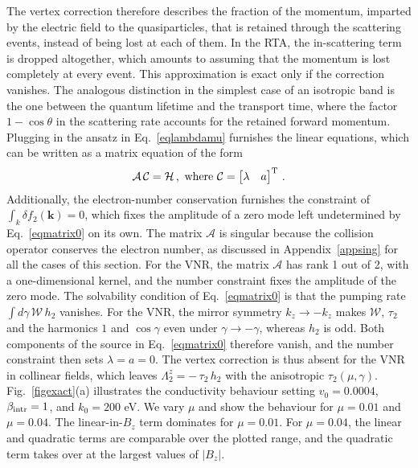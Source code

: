 \documentclass[aps,prb,onecolumn,nofootinbib,citeautoscript,10pt]{revtex4-2}
\begin{document}
The vertex correction therefore describes the fraction of the momentum, imparted by the electric field to the quasiparticles, that is retained through the scattering events, instead of being lost at each of them. In the RTA, the in-scattering term is dropped altogether, which amounts to assuming that the momentum is lost completely at every event. This approximation is exact only if the correction vanishes. The analogous distinction in the simplest case of an isotropic band is the one between the quantum lifetime and the transport time, where the factor $1-\cos\theta$ in the scattering rate accounts for the retained forward momentum. Plugging in the ansatz in Eq.~\eqref{eqlambdamu} furnishes
the linear equations, which can be written as a matrix equation of the form
\begin{align}
\label{eqmatrix0}
\mathcal A \, \mathcal C = \mathcal H \,, \text{ where }
\mathcal C =\begin{bmatrix}
\lambda & a 
\end{bmatrix}^{\rm T}\,.
\end{align}
Additionally, the electron-number conservation furnishes the constraint of
$\int_k  \delta f_{2} (\boldsymbol {k}) = 0 $, which fixes the amplitude of a zero mode left undetermined by Eq.~\eqref{eqmatrix0} on its own. 
The matrix $\mathcal A$ is singular because the collision operator conserves the electron number, as discussed in Appendix~\ref{appsing} for all the cases of this section. For the VNR, the matrix $\mathcal A$ has rank 1 out of 2, with a one-dimensional kernel, and the number constraint fixes the amplitude of the zero mode. The solvability condition of Eq.~\eqref{eqmatrix0} is that the pumping rate $\int d\gamma\,\mathcal W\,h_2$ vanishes. For the VNR, the mirror symmetry $k_z\to-k_z$ makes $\mathcal W$, $\tau_2$ and the harmonics $1$ and $\cos\gamma$ even under $\gamma\to-\gamma$, whereas $h_2$ is odd. Both components of the source in Eq.~\eqref{eqmatrix0} therefore vanish, and the number constraint then sets $\lambda=a=0$. The vertex correction is thus absent for the VNR in collinear fields, which leaves $\Lambda^z_2=-\,\tau_2\,h_2$ with the anisotropic $\tau_2(\mu,\gamma)$.
Fig.~\ref{figexact}(a) illustrates the conductivity behaviour setting $v_0 = 0.0004$, $\beta_{\rm intr} = 1 $, and $k_0=200$ eV. We vary $\mu$ and show the behaviour for $\mu=0.01$ and $\mu=0.04$. The linear-in-$B_z$ term dominates for $\mu=0.01$. For $\mu=0.04$, the linear and quadratic terms are comparable over the plotted range, and the quadratic term takes over at the largest values of $|B_z|$.
\end{document}
